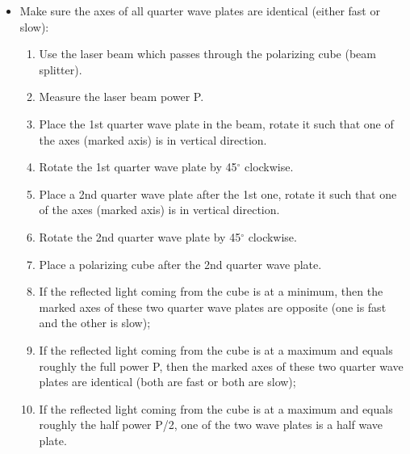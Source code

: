 {\begin{itemize}
\begin{enumerate}
\item Use the laser beam which passes through the polarizing cube (beam splitter).
\item Place the unknown wave plate in the beam.
\item Place a polarizing cube after the unknown wave plate.
\item Place a power meter perpendicular to the polarizing cube such that it
      measures the power of reflected light. 
\item Rotate the unknown wave plate such that the reflected light coming
  from the second cube is at a minimum.
\item Now one of the axes is in horizontal direction and the other is in
      vertical direction.
\end{enumerate}

\item Make sure the axes of all quarter wave plates are identical (either fast or slow):

\begin{enumerate}
\item Use the laser beam which passes through the polarizing cube (beam splitter).
\item Measure the laser beam power P.
\item Place the 1st quarter wave plate in the beam, rotate it such that one of the 
      axes (marked axis) is in vertical direction.
\item Rotate the 1st quarter wave plate by 45$^\circ$ clockwise.
\item Place a 2nd quarter wave plate after the 1st one, rotate it such that one of the 
      axes (marked axis) is in vertical direction.
\item Rotate the 2nd quarter wave plate by 45$^\circ$ clockwise.
\item Place a polarizing cube after the 2nd quarter wave plate.
\item If the reflected light coming from the cube is at a minimum, then the marked 
      axes of these two quarter wave plates are opposite (one is fast and the other 
      is slow);  
\item If the reflected light coming from the cube is at a maximum and equals roughly 
      the full power P, then the marked 
      axes of these two quarter wave plates are identical (both are fast or both are 
      slow);  
\item If the reflected light coming from the cube is at a maximum and equals roughly 
      the half power P/2, one of the two wave plates is a half wave plate.
\end{enumerate}
\end{itemize}

}
